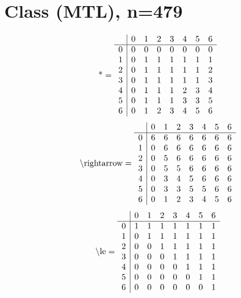 \documentclass[11pt]{article}
\begin{document}
\section{Class (MTL), n=479}
\[\text{*} = 
\begin{array}{r | r r r r r r r}
 & 0 & 1 & 2 & 3 & 4 & 5 & 6 \\ \hline
0 & 0 & 0 & 0 & 0 & 0 & 0 & 0 \\
1 & 0 & 1 & 1 & 1 & 1 & 1 & 1 \\
2 & 0 & 1 & 1 & 1 & 1 & 1 & 2 \\
3 & 0 & 1 & 1 & 1 & 1 & 1 & 3 \\
4 & 0 & 1 & 1 & 1 & 2 & 3 & 4 \\
5 & 0 & 1 & 1 & 1 & 3 & 3 & 5 \\
6 & 0 & 1 & 2 & 3 & 4 & 5 & 6 \\
\end{array}
\]
\[\text{\textbackslash rightarrow} = 
\begin{array}{r | r r r r r r r}
 & 0 & 1 & 2 & 3 & 4 & 5 & 6 \\ \hline
0 & 6 & 6 & 6 & 6 & 6 & 6 & 6 \\
1 & 0 & 6 & 6 & 6 & 6 & 6 & 6 \\
2 & 0 & 5 & 6 & 6 & 6 & 6 & 6 \\
3 & 0 & 5 & 5 & 6 & 6 & 6 & 6 \\
4 & 0 & 3 & 4 & 5 & 6 & 6 & 6 \\
5 & 0 & 3 & 3 & 5 & 5 & 6 & 6 \\
6 & 0 & 1 & 2 & 3 & 4 & 5 & 6 \\
\end{array}
\]
\[\text{\textbackslash le} = 
\begin{array}{r | r r r r r r r}
 & 0 & 1 & 2 & 3 & 4 & 5 & 6 \\ \hline
0 & 1 & 1 & 1 & 1 & 1 & 1 & 1 \\
1 & 0 & 1 & 1 & 1 & 1 & 1 & 1 \\
2 & 0 & 0 & 1 & 1 & 1 & 1 & 1 \\
3 & 0 & 0 & 0 & 1 & 1 & 1 & 1 \\
4 & 0 & 0 & 0 & 0 & 1 & 1 & 1 \\
5 & 0 & 0 & 0 & 0 & 0 & 1 & 1 \\
6 & 0 & 0 & 0 & 0 & 0 & 0 & 1 \\
\end{array}
\]
\end{document}
